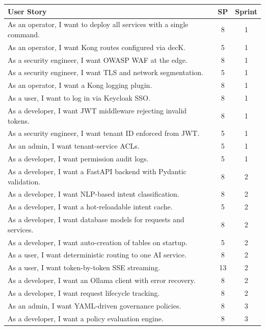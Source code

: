 \begin{table}[H]
\centering
\renewcommand{\arraystretch}{1.2}
\footnotesize
\begin{tabularx}{\textwidth}{| >{\raggedright\arraybackslash}X | c | c |}
\hline
\rowcolor{rowgray}
\textbf{User Story} & \textbf{SP} & \textbf{Sprint} \\
\hline
As an operator, I want to deploy all services with a single command. & 8 & 1 \\
As an operator, I want Kong routes configured via decK. & 5 & 1 \\
As a security engineer, I want OWASP WAF at the edge. & 8 & 1 \\
As a security engineer, I want TLS and network segmentation. & 5 & 1 \\
As an operator, I want a Kong logging plugin. & 8 & 1 \\
As a user, I want to log in via Keycloak SSO. & 8 & 1 \\
As a developer, I want JWT middleware rejecting invalid tokens. & 8 & 1 \\
As a security engineer, I want tenant ID enforced from JWT. & 5 & 1 \\
As an admin, I want tenant-service ACLs. & 5 & 1 \\
As a developer, I want permission audit logs. & 5 & 1 \\
\hline
As a developer, I want a FastAPI backend with Pydantic validation. & 8 & 2 \\
As a developer, I want NLP-based intent classification. & 8 & 2 \\
As a developer, I want a hot-reloadable intent cache. & 5 & 2 \\
As a developer, I want database models for requests and services. & 8 & 2 \\
As a developer, I want auto-creation of tables on startup. & 5 & 2 \\
As a user, I want deterministic routing to one AI service. & 8 & 2 \\
As a user, I want token-by-token SSE streaming. & 13 & 2 \\
As a developer, I want an Ollama client with error recovery. & 8 & 2 \\
As a developer, I want request lifecycle tracking. & 8 & 2 \\
\hline
As an admin, I want YAML-driven governance policies. & 8 & 3 \\
As a developer, I want a policy evaluation engine. & 8 & 3 \\

\end{tabularx}
\end{table}
